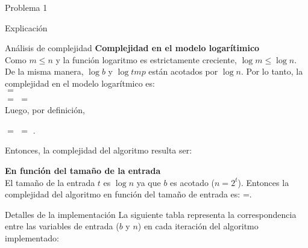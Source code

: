 \begin{section}{Problema 1}
\begin{subsection}{Explicación}
\begin{subsubsection}{Análisis de complejidad}
		\vspace{0.5cm}
		\noindent\textbf{Complejidad en el modelo logarítimico}\\

Como $m\leq n$ y la función logaritmo es estrictamente creciente, $\log m \leq \log n$. De la misma manera, $\log b$ y $\log tmp$ están acotados por $\log n$. Por lo tanto, la complejidad en el modelo logarítmico es: \\
 $=$ \\
$=$  $=$  \\

Luego, por definición, 
			\begin{center}
				 $=$  $=$ .
			\end{center}




		Entonces, la complejidad del algoritmo resulta ser: \VSP
		
		\noindent\textbf{En función del tamaño de la entrada}\\

			El tamaño de la entrada $t$ es $\log n$ ya que $b$ es acotado ($n=2^t$). Entonces la complejidad del algoritmo en función del tamaño de entrada es: =.

		\end{subsubsection}
	\end{subsection}

	\begin{subsection}{Detalles de la implementación}
		La siguiente tabla representa la correspondencia entre las variables de entrada ($b$ y $n$) en cada iteración del algoritmo implementado:


\end{subsection}
\end{section}
